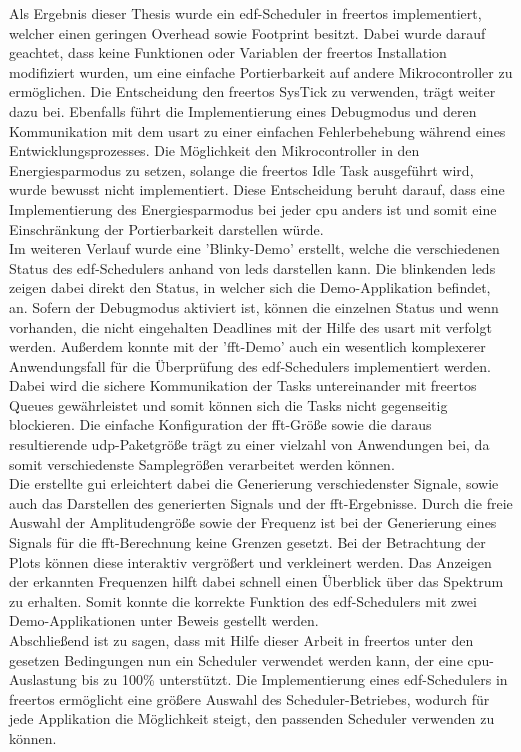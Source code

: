 \documentclass[../EDF Master Thesis.tex]{subfiles}
\begin{document}
    Als Ergebnis dieser Thesis wurde ein \ac{edf}-Scheduler in \ac{freertos} implementiert, welcher einen geringen Overhead sowie Footprint besitzt.
    Dabei wurde darauf geachtet, dass keine Funktionen oder Variablen der \ac{freertos} Installation modifiziert wurden, um eine einfache Portierbarkeit auf andere Mikrocontroller zu ermöglichen.
    Die Entscheidung den \ac{freertos} SysTick zu verwenden, trägt weiter dazu bei.
    Ebenfalls führt die Implementierung eines Debugmodus und deren Kommunikation mit dem \ac{usart} zu einer einfachen Fehlerbehebung während eines Entwicklungsprozesses.
    Die Möglichkeit den Mikrocontroller in den Energiesparmodus zu setzen, solange die \ac{freertos} Idle Task ausgeführt wird, wurde bewusst nicht implementiert.
    Diese Entscheidung beruht darauf, dass eine Implementierung des Energiesparmodus bei jeder \ac{cpu} anders ist und somit eine Einschränkung der Portierbarkeit darstellen würde.\\
    Im weiteren Verlauf wurde eine 'Blinky-Demo' erstellt, welche die verschiedenen Status des \ac{edf}-Schedulers anhand von \ac{led}s darstellen kann.
    Die blinkenden \ac{led}s zeigen dabei direkt den Status, in welcher sich die Demo-Applikation befindet, an.
    Sofern der Debugmodus aktiviert ist, können die einzelnen Status und wenn vorhanden, die nicht eingehalten Deadlines mit der Hilfe des \ac{usart} mit verfolgt werden.
    Außerdem konnte mit der '\ac{fft}-Demo' auch ein wesentlich komplexerer Anwendungsfall für die Überprüfung des \ac{edf}-Schedulers implementiert werden.
    Dabei wird die sichere Kommunikation der Tasks untereinander mit \ac{freertos} Queues gewährleistet und somit können sich die Tasks nicht gegenseitig blockieren.
    Die einfache Konfiguration der \ac{fft}-Größe sowie die daraus resultierende \ac{udp}-Paketgröße trägt zu einer vielzahl von Anwendungen bei, da somit verschiedenste Samplegrößen verarbeitet werden können.\\
    Die erstellte \ac{gui} erleichtert dabei die Generierung verschiedenster Signale, sowie auch das Darstellen des generierten Signals und der \ac{fft}-Ergebnisse.
    Durch die freie Auswahl der Amplitudengröße sowie der Frequenz ist bei der Generierung eines Signals für die \ac{fft}-Berechnung keine Grenzen gesetzt.
    Bei der Betrachtung der Plots können diese interaktiv vergrößert und verkleinert werden.
    Das Anzeigen der erkannten Frequenzen hilft dabei schnell einen Überblick über das Spektrum zu erhalten.
    Somit konnte die korrekte Funktion des \ac{edf}-Schedulers mit zwei Demo-Applikationen unter Beweis gestellt werden.\\
    Abschließend ist zu sagen, dass mit Hilfe dieser Arbeit in \ac{freertos} unter den gesetzen Bedingungen nun ein Scheduler verwendet werden kann, der eine \ac{cpu}-Auslastung bis zu 100\% unterstützt.
    Die Implementierung eines \ac{edf}-Schedulers in \ac{freertos} ermöglicht eine größere Auswahl des Scheduler-Betriebes, wodurch für jede Applikation die Möglichkeit steigt, den passenden Scheduler verwenden zu können.
\end{document}
